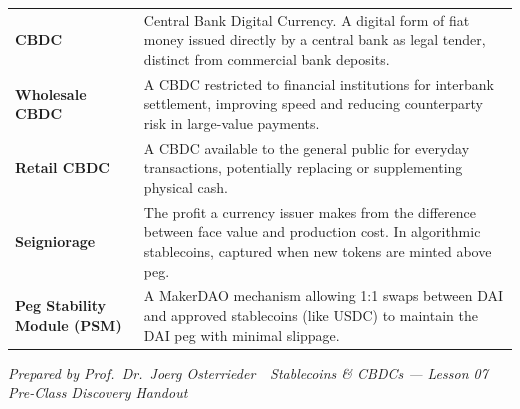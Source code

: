 \documentclass[11pt,a4paper]{article}
\begin{document}
\begin{tabular}{@{}p{3.2cm}p{11.4cm}@{}}
\textbf{CBDC}                     & Central Bank Digital Currency. A digital form of fiat money issued directly by a central bank as legal tender, distinct from commercial bank deposits. \\
\textbf{Wholesale CBDC}           & A CBDC restricted to financial institutions for interbank settlement, improving speed and reducing counterparty risk in large-value payments. \\
\textbf{Retail CBDC}              & A CBDC available to the general public for everyday transactions, potentially replacing or supplementing physical cash. \\
\textbf{Seigniorage}              & The profit a currency issuer makes from the difference between face value and production cost. In algorithmic stablecoins, captured when new tokens are minted above peg. \\
\textbf{Peg Stability Module (PSM)} & A MakerDAO mechanism allowing 1:1 swaps between DAI and approved stablecoins (like USDC) to maintain the DAI peg with minimal slippage. \\
\bottomrule
\end{tabular}

\vspace{6pt}
\noindent\textcolor{mlgray}{\small\textit{Prepared by Prof.\ Dr.\ Joerg Osterrieder \,\textbullet\, Stablecoins \& CBDCs --- Lesson 07 \,\textbullet\, Pre-Class Discovery Handout}}
\end{document}
